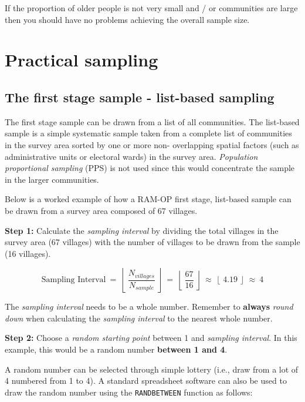 \documentclass[12pt,a4paper]{book}
\theoremstyle{definition}
\theoremstyle{definition}
\theoremstyle{definition}
\theoremstyle{remark}
\begin{document}
If the proportion of older people is not very small and / or communities
are large then you should have no problems achieving the overall sample
size.

\hypertarget{practical-sampling}{%
\section{Practical sampling}\label{practical-sampling}}

\hypertarget{the-first-stage-sample---list-based-sampling}{%
\subsection{The first stage sample - list-based
sampling}\label{the-first-stage-sample---list-based-sampling}}

The first stage sample can be drawn from a list of all communities. The
list-based sample is a simple systematic sample taken from a complete
list of communities in the survey area sorted by one or more non-
overlapping spatial factors (such as administrative units or electoral
wards) in the survey area. \emph{Population proportional sampling} (PPS)
is not used since this would concentrate the sample in the larger
communities.

Below is a worked example of how a RAM-OP first stage, list-based sample
can be drawn from a survey area composed of 67 villages.

\textbf{Step 1:} Calculate the \emph{sampling interval} by dividing the
total villages in the survey area (67 villages) with the number of
villages to be drawn from the sample (16 villages).

\[ \text{Sampling Interval} ~ = ~ \left \lfloor ~ \frac{N_{villages}}{N_{sample}} ~ \right \rfloor ~ = ~ \left \lfloor ~ \frac{67}{16} ~ \right \rfloor ~ \approx ~ \left \lfloor ~ 4.19 ~ \right \rfloor ~ \approx ~ 4 \]

The \emph{sampling interval} needs to be a whole number. Remember to
\textbf{always} \emph{round down} when calculating the \emph{sampling
interval} to the nearest whole number.

\textbf{Step 2:} Choose a \emph{random starting point} between 1 and
\emph{sampling interval}. In this example, this would be a random number
\textbf{between 1 and 4}.

A random number can be selected through simple lottery (i.e., draw from
a lot of 4 numbered from 1 to 4). A standard spreadsheet software can
also be used to draw the random number using the \texttt{RANDBETWEEN}
function as follows:
\end{document}
